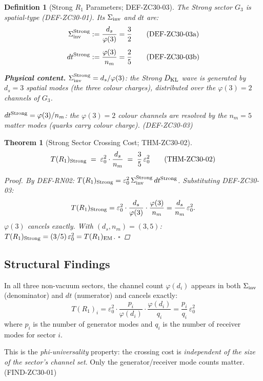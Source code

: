 \documentclass[12pt, a4paper]{article}
\newtheorem{theorem}{Theorem}[section]
\newtheorem{definition}{Definition}[section]
\begin{document}
\begin{definition}[Strong $R_1$ Parameters; DEF-ZC30-03]
\label{zc30:def:strong-params}
The Strong sector $G_3$ is spatial-type (DEF-ZC30-01).
Its $\Sigma_{\rm inv}$ and $dt$ are:
\begin{align}
  \Sigma_{\rm inv}^{\rm Strong}
  &:= \frac{d_s}{\varphi(3)}
   = \frac{3}{2}
  \tag{DEF-ZC30-03a}\label{zc30:def:sigma-s}\\[4pt]
  dt^{\rm Strong}
  &:= \frac{\varphi(3)}{n_m}
   = \frac{2}{5}
  \tag{DEF-ZC30-03b}\label{zc30:def:dt-s}
\end{align}

\textbf{Physical content.}
$\Sigma_{\rm inv}^{\rm Strong} = d_s/\varphi(3)$:
the Strong $D_{\rm KL}$ wave is generated by $d_s = 3$ spatial modes
(the three colour charges), distributed over the $\varphi(3) = 2$
channels of $G_3$.

$dt^{\rm Strong} = \varphi(3)/n_m$:
the $\varphi(3) = 2$ colour channels are resolved by the
$n_m = 5$ matter modes (quarks carry colour charge).
\hfill\textup{(DEF-ZC30-03)}
\end{definition}

\begin{theorem}[Strong Sector Crossing Cost; THM-ZC30-02]
\label{zc30:thm:strong}
\[
  T(R_1)_{\rm Strong}
  \;=\;
  \varepsilon_0^2 \cdot \frac{d_s}{n_m}
  \;=\;
  \frac{3}{5}\,\varepsilon_0^2
  \tag{THM-ZC30-02}\label{zc30:thm:tr1s}
\]

\begin{proof}
By DEF-RN02:
$T(R_1)_{\rm Strong}
  = \varepsilon_0^2\,\Sigma_{\rm inv}^{\rm Strong}\,dt^{\rm Strong}$.
Substituting DEF-ZC30-03:
\[
  T(R_1)_{\rm Strong}
  = \varepsilon_0^2 \cdot
    \frac{d_s}{\varphi(3)} \cdot \frac{\varphi(3)}{n_m}
  = \frac{d_s}{n_m}\,\varepsilon_0^2.
\]
$\varphi(3)$ cancels exactly.
With $(d_s, n_m) = (3, 5)$:
$T(R_1)_{\rm Strong} = (3/5)\,\varepsilon_0^2
= T(R_1)_{\rm EM}$.
\hfill$\square$
\end{proof}
\end{theorem}

\subsection{Structural Findings}
\label{zc30:sec:findings}

\begin{derivedbox}[title={FIND-ZC30-01:
  Phi-Universality --- $\varphi(d_i)$ Always Cancels}]
In all three non-vacuum sectors, the channel count
$\varphi(d_i)$ appears in both $\Sigma_{\rm inv}$ (denominator)
and $dt$ (numerator) and cancels exactly:
\[
  T(R_1)_i
  = \varepsilon_0^2 \cdot
    \frac{p_i}{\varphi(d_i)} \cdot \frac{\varphi(d_i)}{q_i}
  = \frac{p_i}{q_i}\,\varepsilon_0^2
  \tag{FIND-ZC30-01}
\]
where $p_i$ is the number of generator modes and $q_i$ is the
number of receiver modes for sector $i$.

This is the \emph{phi-universality} property:
the crossing cost is \emph{independent of the size of the
sector's channel set}. Only the generator/receiver mode counts matter.
\hfill\textup{(FIND-ZC30-01)}
\end{derivedbox}
\end{document}
